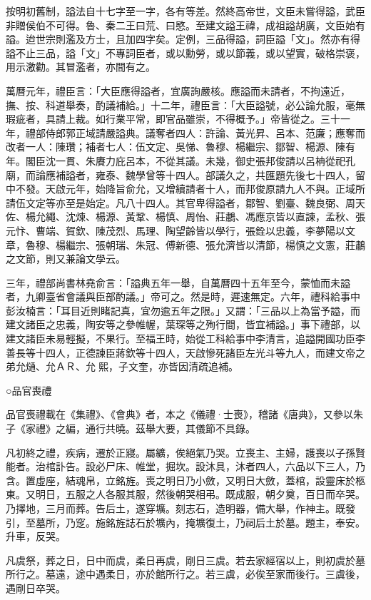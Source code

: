 按明初舊制，謚法自十七字至一字，各有等差。然終高帝世，文臣未嘗得謚，武臣非贈侯伯不可得。魯、秦二王曰荒、曰愍。至建文謚王禕，成祖謚胡廣，文臣始有謚。迨世宗則濫及方士，且加四字矣。定例，三品得謚，詞臣謚「文」。然亦有得謚不止三品，謚「文」不專詞臣者，或以勳勞，或以節義，或以望實，破格崇褒，用示激勸。其冒濫者，亦間有之。

萬曆元年，禮臣言：「大臣應得謚者，宜廣詢嚴核。應謚而未請者，不拘遠近，撫、按、科道舉奏，酌議補給。」十二年，禮臣言：「大臣謚號，必公論允服，毫無瑕疵者，具請上裁。如行業平常，即官品雖崇，不得概予。」帝皆從之。三十一年，禮部侍郎郭正域請嚴謚典。議奪者四人：許論、黃光昇、呂本、范廉；應奪而改者一人：陳瓚；補者七人：伍文定、吳悌、魯穆、楊繼宗、鄒智、楊源、陳有年。閣臣沈一貫、朱賡力庇呂本，不從其議。未幾，御史張邦俊請以呂柟從祀孔廟，而論應補謚者，雍泰、魏學曾等十四人。部議久之，共匯題先後七十四人，留中不發。天啟元年，始降旨俞允，又增續請者十人，而邦俊原請九人不與。正域所請伍文定等亦至是始定。凡八十四人。其官卑得謚者，鄒智、劉臺、魏良弼、周天佐、楊允繩、沈煉、楊源、黃鞏、楊慎、周怡、莊鷫、馮應京皆以直諫，孟秋、張元忭、曹端、賀欽、陳茂烈、馬理、陶望齡皆以學行，張銓以忠義，李夢陽以文章，魯穆、楊繼宗、張朝瑞、朱冠、傅新德、張允濟皆以清節，楊慎之文憲，莊鷫之文節，則又兼論文學云。

三年，禮部尚書林堯俞言：「謚典五年一舉，自萬曆四十五年至今，蒙恤而未謚者，九卿臺省會議與臣部酌議。」帝可之。然是時，遲速無定。六年，禮科給事中彭汝楠言：「耳目近則睹記真，宜勿逾五年之限。」又謂：「三品以上為當予謚，而建文諸臣之忠義，陶安等之參帷幄，葉琛等之殉行間，皆宜補謚。」事下禮部，以建文諸臣未易輕擬，不果行。至福王時，始從工科給事中李清言，追謚開國功臣李善長等十四人，正德諫臣蔣欽等十四人，天啟慘死諸臣左光斗等九人，而建文帝之弟允熥、允ＡＲ、允熙，子文奎，亦皆因清疏追補。

○品官喪禮

品官喪禮載在《集禮》、《會典》者，本之《儀禮·士喪》，稽諸《唐典》，又參以朱子《家禮》之編，通行共曉。茲舉大要，其儀節不具錄。

凡初終之禮，疾病，遷於正寢。屬纊，俟絕氣乃哭。立喪主、主婦，護喪以子孫賢能者。治棺訃告。設必尸床、帷堂，掘坎。設沐具，沐者四人，六品以下三人，乃含。置虛座，結魂帛，立銘旌。喪之明日乃小斂，又明日大斂，蓋棺，設靈床於柩東。又明日，五服之人各服其服，然後朝哭相弔。既成服，朝夕奠，百日而卒哭。乃擇地，三月而葬。告后土，遂穿壙。刻志石，造明器，備大舉，作神主。既發引，至墓所，乃窆。施銘旌誌石於壙內，掩壙復土，乃祠后土於墓。題主，奉安。升車，反哭。

凡虞祭，葬之日，日中而虞，柔日再虞，剛日三虞。若去家經宿以上，則初虞於墓所行之。墓遠，途中遇柔日，亦於館所行之。若三虞，必俟至家而後行。三虞後，遇剛日卒哭。

